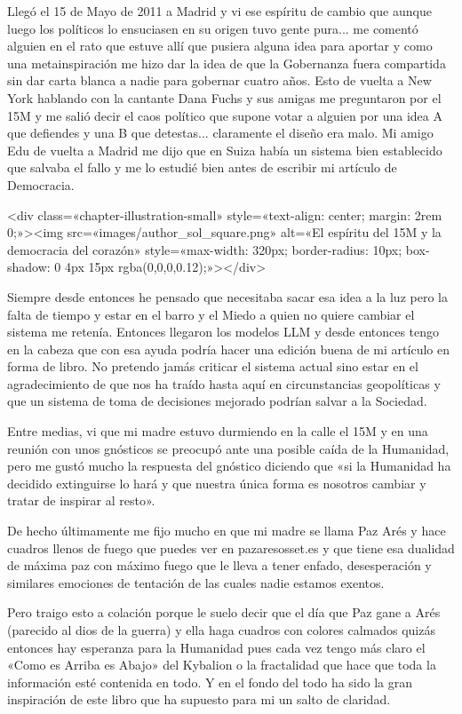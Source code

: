 \documentclass[11pt,a5paper]{book}
\begin{document}
Llegó el 15 de Mayo de 2011 a Madrid y vi ese espíritu de cambio que aunque luego los políticos lo ensuciasen en su origen tuvo gente pura... me comentó alguien en el rato que estuve allí que pusiera alguna idea para aportar y como una metainspiración me hizo dar la idea de que la Gobernanza fuera compartida sin dar carta blanca a nadie para gobernar cuatro años. Esto de vuelta a New York hablando con la cantante Dana Fuchs y sus amigas me preguntaron por el 15M y me salió decir el caos político que supone votar a alguien por una idea A que defiendes y una B que detestas... claramente el diseño era malo. Mi amigo Edu de vuelta a Madrid me dijo que en Suiza había un sistema bien establecido que salvaba el fallo y me lo estudié bien antes de escribir mi artículo de Democracia.

<div class=«chapter-illustration-small» style=«text-align: center; margin: 2rem 0;»><img src=«images/author_sol_square.png» alt=«El espíritu del 15M y la democracia del corazón» style=«max-width: 320px; border-radius: 10px; box-shadow: 0 4px 15px rgba(0,0,0,0.12);»></div>

Siempre desde entonces he pensado que necesitaba sacar esa idea a la luz pero la falta de tiempo y estar en el barro y el Miedo a quien no quiere cambiar el sistema me retenía. Entonces llegaron los modelos LLM y desde entonces tengo en la cabeza que con esa ayuda podría hacer una edición buena de mi artículo en forma de libro. No pretendo jamás criticar el sistema actual sino estar en el agradecimiento de que nos ha traído hasta aquí en circunstancias geopolíticas y que un sistema de toma de decisiones mejorado podrían salvar a la Sociedad.

Entre medias, vi que mi madre estuvo durmiendo en la calle el 15M y en una reunión con unos gnósticos se preocupó ante una posible caída de la Humanidad, pero me gustó mucho la respuesta del gnóstico diciendo que «si la Humanidad ha decidido extinguirse lo hará y que nuestra única forma es nosotros cambiar y tratar de inspirar al resto». 

De hecho últimamente me fijo mucho en que mi madre se llama Paz Arés y hace cuadros llenos de fuego que puedes ver en pazaresosset.es y que tiene esa dualidad de máxima paz con máximo fuego que le lleva a tener enfado, desesperación y similares emociones de tentación de las cuales nadie estamos exentos.

Pero traigo esto a colación porque le suelo decir que el día que Paz gane a Arés (parecido al dios de la guerra) y ella haga cuadros con colores calmados quizás entonces hay esperanza para la Humanidad pues cada vez tengo más claro el «Como es Arriba es Abajo» del Kybalion o la fractalidad que hace que toda la información esté contenida en todo. Y en el fondo del todo ha sido la gran inspiración de este libro que ha supuesto para mi un salto de claridad.
\end{document}
